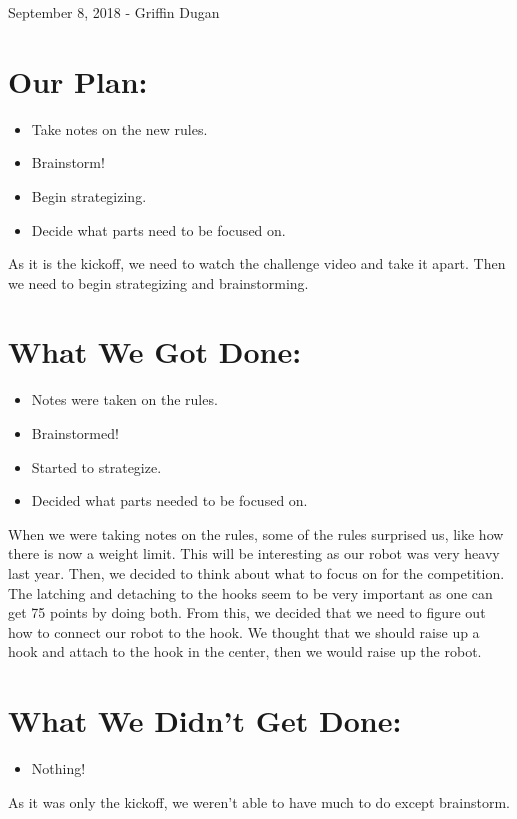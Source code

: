 \documentclass[12pt]{article}
\begin{document}
\newpage
\setcounter{section}{0}

September 8, 2018 - Griffin Dugan

\section{Our Plan:} 
\begin{itemize}
	\item Take notes on the new rules. 
	\item Brainstorm! 
	\item Begin strategizing.
	\item Decide what parts need to be focused on. 
\end{itemize}

As it is the kickoff, we need to watch the challenge video and take it apart. Then we need to begin strategizing and brainstorming. 

\section{What We Got Done:}
\begin{itemize}
	\item Notes were taken on the rules.
	\item Brainstormed! 
	\item Started to strategize. 
	\item Decided what parts needed to be focused on. 
\end{itemize}

When we were taking notes on the rules, some of the rules surprised us, like how there is now a weight limit. This will be interesting as our robot was very heavy last year. Then, we decided to think about what to focus on for the competition. The latching and detaching to the hooks seem to be very important as one can get 75 points by doing both. From this, we decided that we need to figure out how to connect our robot to the hook. We thought that we should raise up a hook and attach to the hook in the center, then we would raise up the robot. 

\section{What We Didn't Get Done:} 
\begin{itemize}
	\item Nothing! 
\end{itemize}

As it was only the kickoff, we weren't able to have much to do except brainstorm. 
\end{document}
